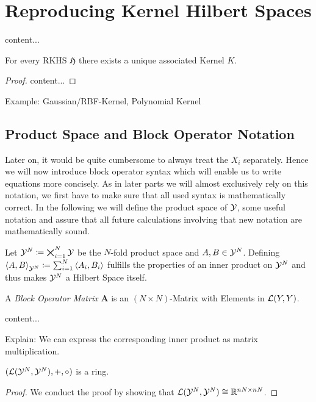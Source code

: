 \section{Reproducing Kernel Hilbert Spaces}

\begin{definition}[RKHS]
	\label{def:rkhs}
	content...
\end{definition}

\begin{theorem}
	\label{theo:kernel-for-rkhs}
	For every RKHS $\mathfrak{H}$ there exists a unique associated Kernel $K$.
\end{theorem}
\begin{proof}
	content...
\end{proof}

Example: Gaussian/RBF-Kernel, Polynomial Kernel

\subsection{Product Space and Block Operator Notation}
Later on, it would be quite cumbersome to always treat the $X_i$ separately.
Hence we will now introduce block operator syntax which will enable us to write equations more concisely.
As in later parts we will almost exclusively rely on this notation, we first have to make sure that all used syntax is mathematically correct.
In the following we will define the product space of $\mathcal{Y}$, some useful notation and assure that all future calculations involving that new notation are mathematically sound.

Let $\mathcal{Y}^N \coloneqq \bigtimes_{i=1}^N \mathcal{Y}$ be the $N$-fold product space and $A, B \in \mathcal{Y}^N$.
Defining $\left < A, B \right >_{\mathcal{Y}^N} \coloneqq \sum_{i=1}^{N} \left <A_i, B_i \right >$ fulfills the properties of an inner product on $\cY^N$ and thus makes $\cY^N$ a Hilbert Space itself.


\begin{definition}
	A \emph{Block Operator Matrix} $\mathbf{A}$ is an $(N \times N)$-Matrix with Elements in $\mathcal{L}(Y, Y)$.
\end{definition}

\begin{definition}[$\cY^N$]
	content...
\end{definition}
Explain: We can express the corresponding inner product as matrix multiplication.

\begin{theorem}
	$(\mathcal{L}(\mathcal{Y}^N, \mathcal{Y}^N), +, \circ)$ is a  ring.
\end{theorem}
\begin{proof}
	We conduct the proof by showing that $\mathcal{L}(\mathcal{Y}^N, \mathcal{Y}^N) \cong \mathbb{R}^{nN \times nN}$.
\end{proof}


